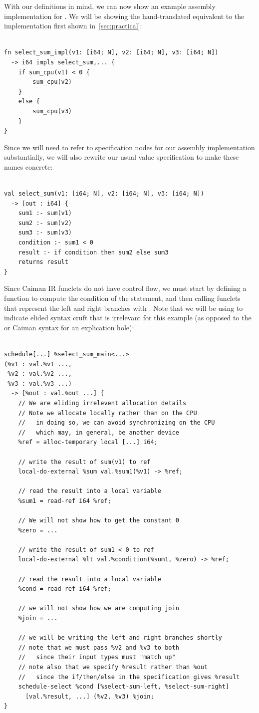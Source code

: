 With our definitions in mind, we can now show an example assembly implementation for .  We will be showing the hand-translated equivalent to the implementation first shown in~\ref{sec:practical}:
%
\begin{lstlisting}

fn select_sum_impl(v1: [i64; N], v2: [i64; N], v3: [i64; N]) 
  -> i64 impls select_sum,... {
    if sum_cpu(v1) < 0 { 
        sum_cpu(v2)
    }
    else {
        sum_cpu(v3)
    }
}
\end{lstlisting}
%
Since we will need to refer to specification nodes for our assembly implementation substantially, we will also rewrite our usual value specification to make these names concrete:
%
\begin{lstlisting}

val select_sum(v1: [i64; N], v2: [i64; N], v3: [i64; N]) 
  -> [out : i64] {
    sum1 :- sum(v1)
    sum2 :- sum(v2)
    sum3 :- sum(v3)
    condition :- sum1 < 0
    result :- if condition then sum2 else sum3
    returns result
}
\end{lstlisting}
%
Since Caiman IR funclets do not have control flow, we must start by defining a function to compute the condition of the  statement, and then calling funclets that represent the left and right branches with .  Note that we will be using  to indicate elided syntax cruft that is irrelevant for this example (as opposed to the  or  Caiman syntax for an explication hole):
%
\begin{lstlisting}

schedule[...] %select_sum_main<...>
(%v1 : val.%v1 ..., 
 %v2 : val.%v2 ..., 
 %v3 : val.%v3 ...) 
  -> [%out : val.%out ...] {
    // We are eliding irrelevent allocation details
    // Note we allocate locally rather than on the CPU
    //   in doing so, we can avoid synchronizing on the CPU
    //   which may, in general, be another device
    %ref = alloc-temporary local [...] i64;
    
    // write the result of sum(v1) to ref
    local-do-external %sum val.%sum1(%v1) -> %ref;
    
    // read the result into a local variable
    %sum1 = read-ref i64 %ref;
    
    // We will not show how to get the constant 0
    %zero = ...
    
    // write the result of sum1 < 0 to ref
    local-do-external %lt val.%condition(%sum1, %zero) -> %ref;
    
    // read the result into a local variable
    %cond = read-ref i64 %ref;
    
    // we will not show how we are computing join
    %join = ...
    
    // we will be writing the left and right branches shortly
    // note that we must pass %v2 and %v3 to both
    //   since their input types must "match up"
    // note also that we specify %result rather than %out
    //   since the if/then/else in the specification gives %result
    schedule-select %cond [%select-sum-left, %select-sum-right]
      [val.%result, ...] (%v2, %v3) %join;
}
\end{lstlisting}

